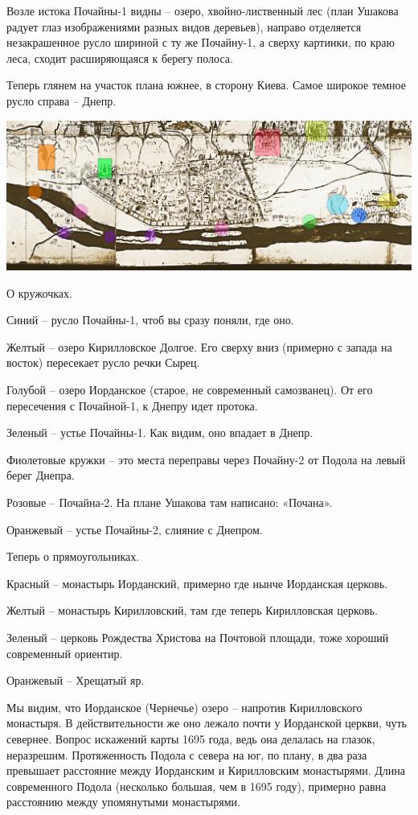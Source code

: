Возле истока Почайны-1 видны – озеро, хвойно-лист\-венный лес (план Ушакова радует глаз изображениями разных видов деревьев), направо отделяется незакрашенное русло шириной с ту же Почайну-1, а сверху картинки, по краю леса, сходит расширяющаяся к берегу полоса.

Теперь глянем на участок плана южнее, в сторону Киева. Самое широкое темное русло справа – Днепр.

\begin{center}
\includegraphics[width=\linewidth]{chast-colebanie-osnov/pochayna/po1695.jpg}
\end{center}

О кружочках.

Синий – русло Почайны-1, чтоб вы сразу поняли, где оно.

Желтый – озеро Кирилловское Долгое. Его сверху вниз (примерно с запада на восток) пересекает русло речки Сырец.

Голубой – озеро Иорданское (старое, не современный самозванец). От его пересечения с Почайной-1, к Днепру идет протока.

Зеленый – устье Почайны-1. Как видим, оно впадает в Днепр. 

Фиолетовые кружки – это места переправы через Почайну-2 от Подола на левый берег Днепра.

Розовые – Почайна-2. На плане Ушакова там написано: «Почана».

Оранжевый – устье Почайны-2, слияние с Днепром.

Теперь о прямоугольниках.

Красный – монастырь Иорданский, примерно где нынче Иорданская церковь.

Желтый – монастырь Кирилловский, там где теперь Кирилловская церковь.

Зеленый – церковь Рождества Христова на Почтовой площади, тоже хороший современный ориентир.

Оранжевый – Хрещатый яр.

Мы видим, что Иорданское (Чернечье) озеро – напротив Кирилловского монастыря. В действительности же оно лежало почти у Иорданской церкви, чуть севернее. Вопрос искажений карты 1695 года, ведь она делалась на глазок, неразрешим. Протяженность Подола с севера на юг, по плану, в два раза превышает расстояние между Иорданским и Кирилловским монастырями. Длина современного Подола (несколько большая, чем в 1695 году), примерно равна расстоянию между упомянутыми монастырями.

